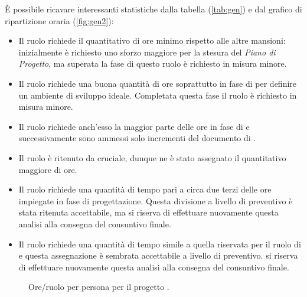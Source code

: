 È possibile ricavare interessanti statistiche dalla tabella (\ref{tab:gen}) e dal grafico di ripartizione oraria (\ref{fig:gen2}): %
\begin{itemize}
\item Il ruolo {\Rx} richiede il quantitativo di ore minimo rispetto alle altre mansioni: inizialmente è richiesto uno sforzo maggiore per la stesura del \emph{Piano di Progetto}, ma superata la fase di {\AR} questo ruolo è richiesto in misura minore.
\item Il ruolo {\AMx} richiede una buona quantità di ore soprattutto in fase di {\AR} per definire un ambiente di sviluppo ideale. Completata questa fase il ruolo è richiesto in misura minore.
\item Il ruolo {\ANx} richiede anch'esso la maggior parte delle ore in fase di {\AR} e successivamente sono ammessi solo incrementi del documento di {\AR}.
\item Il ruolo {\PJx} è ritenuto da {\hx} cruciale, dunque ne è stato assegnato il quantitativo maggiore di ore.
\item Il ruolo {\PGx} richiede una quantità di tempo pari a circa due terzi delle ore impiegate in fase di progettazione. Questa divisione a livello di preventivo è stata ritenuta accettabile, ma {\hx} si riserva di effettuare nuovamente questa analisi alla consegna del consuntivo finale.
\item Il ruolo {\Vx} richiede una quantità di tempo simile a quella riservata per il ruolo di {\PGx} e questa assegnazione è sembrata accettabile a livello di preventivo. {\hx} si riserva di effettuare nuovamente questa analisi alla consegna del consuntivo finale.
\end{itemize}



\pagebreak

\begin{figure}[H]
\caption{Ore/ruolo per persona per il progetto {\proj}.}
\label{fig:gen1}

\end{figure}

